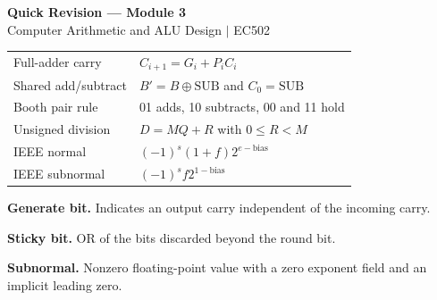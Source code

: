 \documentclass[12pt,a4paper]{article}
\renewcommand{\arraystretch}{1.45}
\begin{document}
\newpage
\begin{center}
  {\large\bfseries\color{myred} Quick Revision --- Module 3}\\[3pt]
  {\small\color{mydark} Computer Arithmetic and ALU Design $|$ EC502}
\end{center}
\noindent{\color{myred}\rule{\linewidth}{1.2pt}}
\begin{tcolorbox}[formulabox,title={Key Formulas at a Glance}]
\renewcommand{\arraystretch}{1.35}
\begin{tabularx}{\linewidth}{B{5.0cm}Y}
Full-adder carry & $C_{i+1}=G_i+P_i C_i$ \\[3pt]
Shared add/subtract & $B'=B\oplus\mathrm{SUB}$ and $C_0=\mathrm{SUB}$ \\[3pt]
Booth pair rule & 01 adds, 10 subtracts, 00 and 11 hold \\[3pt]
Unsigned division & $D=MQ+R$ with $0\le R<M$ \\[3pt]
IEEE normal & $(-1)^s(1+f)2^{e-\mathrm{bias}}$ \\[3pt]
IEEE subnormal & $(-1)^sf2^{1-\mathrm{bias}}$ \\[3pt]
\end{tabularx}
\end{tcolorbox}
\begin{tcolorbox}[defbox,title={One-Line Definitions}]
\textbf{Generate bit.} Indicates an output carry independent of the incoming carry.\par
\textbf{Sticky bit.} OR of the bits discarded beyond the round bit.\par
\textbf{Subnormal.} Nonzero floating-point value with a zero exponent field and an implicit leading zero.\par
\end{tcolorbox}
\end{document}
